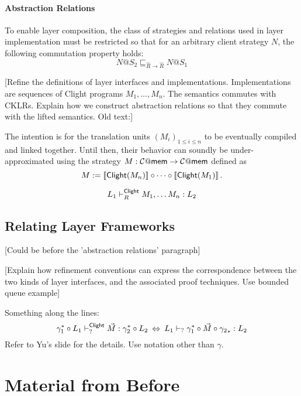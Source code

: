 \documentclass[sigplan,10pt,authordraft]{acmart}
\begin{document}

\paragraph{Abstraction Relations} %

To enable layer composition,
the class of strategies and relations
used in layer implementation must be restricted
so that for an arbitrary client strategy $N$,
the following commutation property holds:
\[
  N@S_2 \sqsubseteq_{\hat{R} \rightarrow \hat{R}} N@S_1
\]

[Refine the definitions of layer interfaces and implementations.
Implementations are sequences of Clight programs $M_1, \ldots, M_n$.
The semantics commutes with CKLRs.
Explain how we construct abstraction relations
so that they commute with the lifted semantics.
Old text:]

The intention is for the translation units $(M_i)_{1 \le i \le n}$
to be eventually compiled and linked together.
Until then,
their behavior can soundly be under-approximated
using the strategy
$M : \mathcal{C}@ \mathsf{mem}  \rightarrow \mathcal{C}@ \mathsf{mem} $
defined as
\[
  M := \llbracket  \mathsf{Clight} (M_n) \rrbracket \circ \cdots \circ
       \llbracket  \mathsf{Clight} (M_1) \rrbracket
  \,.
\]

\[
  L_1 \vdash^{ \mathsf{Clight} }_R M_1, \ldots M_n : L_2
\]



\subsection{Relating Layer Frameworks} %

[Could be before the 'abstraction relations' paragraph]

[Explain how refinement conventions
can express the correspondence between
the two kinds of layer interfaces,
and the associated proof techniques.
Use bounded queue example]


Something along the lines:
\[
  \gamma_1^* \circ L_1 \vdash^{ \mathsf{Clight} }_? \vec{M} : \gamma_2^* \circ L_2
  \:\Leftrightarrow\:
  L_1 \vdash_? \gamma_1^* \circ \vec{M} \circ {\gamma_2}_* : L_2
\]
Refer to Yu's slide for the details.
Use notation other than $\gamma$.


\section*{Material from Before}
\end{document}
